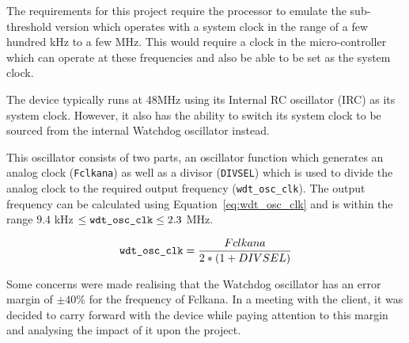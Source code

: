 The requirements for this project require the processor to emulate the sub-threshold version which operates with a system clock in the range of a few hundred kHz to a few MHz. This would require a clock in the micro-controller which can operate at these frequencies and also be able to be set as the system clock.

The device typically runs at 48MHz using its Internal RC oscillator (IRC) as its system clock. However, it also has the ability to switch its system clock to be sourced from the internal Watchdog oscillator instead. 

This oscillator consists of two parts, an oscillator function which generates an analog clock (\verb|Fclkana|) as well as a divisor (\verb|DIVSEL|) which is used to divide the analog clock to the required output frequency (\verb|wdt_osc_clk|). The output frequency can be calculated using Equation~\ref{eq:wdt_osc_clk} and is within the range $ 9.4 $ kHz $ \leq \verb|wdt_osc_clk| \leq 2.3 $ MHz. \cite{mbed_datasheet}

\begin{equation}
	\label{eq:wdt_osc_clk}
	\verb|wdt_osc_clk| = \frac{Fclkana}{2 * (1 + DIVSEL)}
\end{equation}

Some concerns were made realising that the Watchdog oscillator has an error margin of $\pm 40\%$ for the frequency of Fclkana. In a meeting with the client, it was decided to carry forward with the device while paying attention to this margin and analysing the impact of it upon the project.